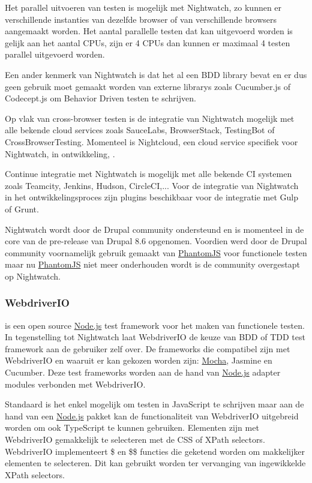 Het parallel uitvoeren van testen is mogelijk met Nightwatch, zo kunnen er verschillende instanties van dezelfde browser of van verschillende browsers aangemaakt worden. Het aantal parallelle testen dat kan uitgevoerd worden is gelijk aan het aantal \glspl{CPU}, zijn er 4 \glspl{CPU} dan kunnen er maximaal 4 testen parallel uitgevoerd worden.

Een ander kenmerk van Nightwatch is dat het al een \gls{BDD} \gls{library} bevat en er dus geen gebruik moet gemaakt worden van externe \glspl{library} zoals Cucumber.js of Codecept.js om Behavior Driven testen te schrijven.

Op vlak van cross-browser testen is de integratie van Nightwatch mogelijk met alle bekende cloud services zoals SauceLabs, BrowserStack, TestingBot of CrossBrowserTesting. Momenteel is Nightcloud, een cloud service specifiek voor Nightwatch, in ontwikkeling, \textcite{Nightcloud2017}.

\clearpage
Continue integratie met Nightwatch is mogelijk met alle bekende \gls{CI} systemen zoals Teamcity, Jenkins, Hudson, CircleCI,... Voor de integratie van Nightwatch in het ontwikkelingsproces zijn plugins beschikbaar voor de integratie met \gls{Gulp} of \gls{Grunt}.

Nightwatch wordt door de Drupal community ondersteund en is momenteel in de core van de pre-release van Drupal 8.6 opgenomen. Voordien werd door de Drupal community voornamelijk gebruik gemaakt van \hyperref[phantomjs]{PhantomJS} voor functionele testen maar nu \hyperref[phantomjs]{PhantomJS} niet meer onderhouden wordt is de community overgestapt op Nightwatch.

\subsubsection{WebdriverIO}
\textcite{WebdriverIO} is een open source \hyperref[nodejs]{Node.js} test \gls{framework} voor het maken van functionele testen. In tegenstelling tot Nightwatch laat WebdriverIO de keuze van \gls{BDD} of \gls{TDD} test \gls{framework} aan de gebruiker zelf  over. De \glspl{framework} die compatibel zijn met WebdriverIO en waaruit er kan gekozen worden zijn: \hyperref[mocha]{Mocha}, Jasmine en Cucumber. Deze test \glspl{framework} worden aan de hand van \hyperref[nodejs]{Node.js} adapter modules verbonden met WebdriverIO.

Standaard is het enkel mogelijk om testen in JavaScript te schrijven maar aan de hand van een \hyperref[nodejs]{Node.js} pakket kan de functionaliteit van WebdriverIO uitgebreid worden om ook \gls{TypeScript} te kunnen gebruiken. Elementen zijn met WebdriverIO gemakkelijk te selecteren met de \gls{CSS} of \gls{XPath} selectors. WebdriverIO implementeert \$ en \$\$ functies die geketend worden om makkelijker elementen te selecteren. Dit kan gebruikt worden ter vervanging van ingewikkelde \gls{XPath} selectors.


